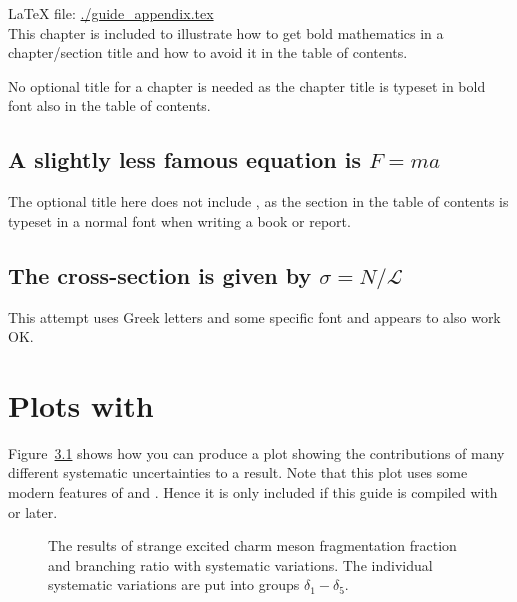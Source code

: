 \LaTeX{} file: \url{./guide_appendix.tex}\\[1ex]
\noindent
This chapter is included to illustrate how to get bold mathematics in
a chapter/section title and how to avoid it in the table of contents.

No optional title for a chapter is needed as the chapter title is typeset in bold
font also in the table of contents.

\section[A slightly less famous equation is $F = m a$]%
        {A slightly less famous equation is \boldmath$F = m a$}
\label{sec:fma}

The optional title here does not include , as the
section in the table of contents is typeset in a normal font when
writing a book or report.


\section[The cross-section is given by $\sigma = N / \mathcal{L}$]%
        {The cross-section is given by \boldmath$\sigma = N / \mathcal{L}$}
\label{sec:sig}

This attempt uses Greek letters and some specific font and appears to
also work OK.


\chapter{Plots with }
\label{sec:app:tikz}

Figure~\ref{fig:tikz:syst} shows how you can produce a plot showing
the contributions of many different systematic uncertainties to a
result. Note that this plot uses some modern features of
 and . Hence it is only included if
this guide is compiled with  or later.


\begin{figure}[htbp]
  \centering
   {%
  }{%
    
  }
  \caption[Strange $D^{**}$ systematics, fragmentation fractions]{The
    results of strange excited charm meson fragmentation fraction and
    branching ratio with systematic variations.  The individual
    systematic variations are put into groups $\delta_1-\delta_5$.}
  \label{fig:tikz:syst}
\end{figure}


